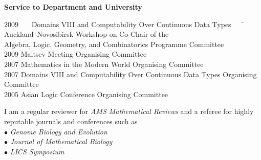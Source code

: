 \documentclass[12pt]{article}
\begin{document}
\centerline{\bf Service to Department and University}
\begin{tabbing}
2009 \ \ \ \= Domains VIII and Computability Over Continuous Data Types \ \ \ \=           \> Auckland--Novosibirsk Workshop on       \> Co-Chair of the \\
              \> Algebra, Logic, Geometry, and Combinatorics      \> Programme Committee \\
2009          \> Maltsev Meeting                          \> Organising Committee\\
2007          \> Mathematics in the Modern World          \> Organising Committee\\
2007          \> Domains VIII and Computability Over Continuous Data Types     \> Organising Committee\\
2005          \> Asian Logic Conference                   \> Organising Committee%
\end{tabbing}

\noindent I am a regular reviewer for {\em AMS Mathematical Reviews} and a referee for highly reputable journals and conferences such as\\
$\bullet$ {\em Genome Biology and Evolution}\\
$\bullet$ {\em Journal of Mathematical Biology}\\
$\bullet$ {\em LICS Symposium}
\vskip30pt
\iftoggle{full}{
\flushright{This CV: \url{https://gavruskin.github.io/AGcv.pdf}}
}{
\flushright{This CV: \url{https://gavruskin.github.io/AGcv_short.pdf}}
}
\end{document}
